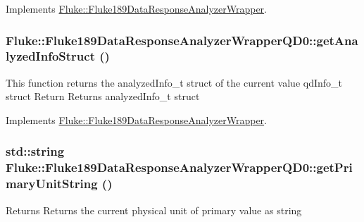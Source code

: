 Implements \hyperlink{classFluke_1_1Fluke189DataResponseAnalyzerWrapper_a8c24a1f3d5abae862ffa06a3a7ac44f1}{Fluke::Fluke189DataResponseAnalyzerWrapper}.\hypertarget{classFluke_1_1Fluke189DataResponseAnalyzerWrapperQD0_af6e15c77a255dbebaaeb61e6848e8b42}{
\subsubsection[{getAnalyzedInfoStruct}]{ Fluke::Fluke189DataResponseAnalyzerWrapperQD0::getAnalyzedInfoStruct ()}}
\label{classFluke_1_1Fluke189DataResponseAnalyzerWrapperQD0_af6e15c77a255dbebaaeb61e6848e8b42}
This function returns the analyzedInfo\_\-t struct of the current value qdInfo\_\-t struct Return Returns analyzedInfo\_\-t struct 

Implements \hyperlink{classFluke_1_1Fluke189DataResponseAnalyzerWrapper_a006925b794ce1cd11ca13668fbcf5b64}{Fluke::Fluke189DataResponseAnalyzerWrapper}.\hypertarget{classFluke_1_1Fluke189DataResponseAnalyzerWrapperQD0_a95eb5efb6652935a968b6063b6ae59ad}{
\subsubsection[{getPrimaryUnitString}]{\setlength{\rightskip}{0pt plus 5cm}std::string Fluke::Fluke189DataResponseAnalyzerWrapperQD0::getPrimaryUnitString ()}}
\label{classFluke_1_1Fluke189DataResponseAnalyzerWrapperQD0_a95eb5efb6652935a968b6063b6ae59ad}
\begin{DoxyReturn}{Returns}
Returns the current physical unit of primary value as string 
\end{DoxyReturn}


